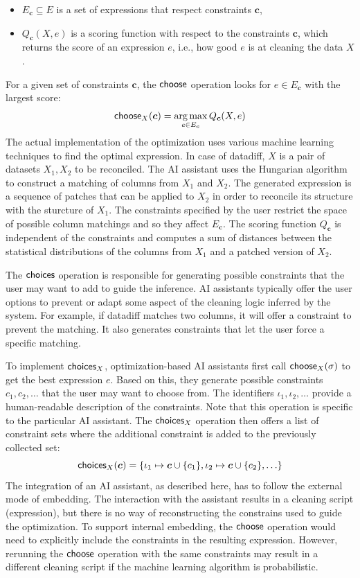 \documentclass[a4paper,UKenglish,cleveref, autoref, thm-restate]{lipics-v2021}
\newcommand{\ident}[1]{\textsf{#1}}
\newcommand{\select}{\textnormal{\ident{choose}}}
\newcommand{\choices}{\textnormal{\ident{choices}}}
\DeclareMathOperator{\argmax}{arg\,max}
\begin{document}
\begin{itemize}
\item $E_{\boldsymbol{c}}\subseteq E$ is a set of expressions that respect constraints $\boldsymbol{c}$,
\item $Q_{\boldsymbol{c}}(X, e)$ is a scoring function with respect to the constraints $\boldsymbol{c}$,
  which returns the score of an expression $e$, i.e., how good $e$ is at cleaning the data $X$.
\end{itemize}

\noindent
For a given set of constraints $\boldsymbol{c}$, the $\select$ operation looks
for $e\in E_{\boldsymbol{c}}$ with the largest score:
\[
\select_X(\boldsymbol{c}) = \argmax_{e \in E_{\boldsymbol{c}}} Q_{\boldsymbol{c}}(X, e)
\]
The actual implementation of the optimization uses various machine learning techniques to
find the optimal expression. In case of datadiff, $X$ is a pair of datasets $X_1, X_2$ to be
reconciled. The AI assistant uses the Hungarian algorithm \cite{sutton-2018-datadiff} to construct
a matching of columns from $X_1$ and $X_2$. The generated expression is a sequence of patches
that can be applied to $X_2$ in order to reconcile its structure with the sturcture of $X_1$.
The constraints specified by the user restrict the space of possible column matchings and so they
affect $E_\boldsymbol{c}$. The scoring function $Q_\boldsymbol{c}$ is independent of
the constraints and computes a sum of distances between the statistical distributions of the
columns from $X_1$ and a patched version of $X_2$.

The $\choices$ operation is responsible for generating possible constraints that the user may
want to add to guide the inference. AI assistants typically offer the user options to prevent
or adapt some aspect of the cleaning logic inferred by the system. For example, if datadiff
matches two columns, it will offer a constraint to prevent the matching. It also generates
constraints that let the user force a specific matching.

To implement $\choices_X$, optimization-based AI assistants first call $\select_X(\sigma)$ to
get the best expression $e$. Based on this, they generate possible constraints $c_1, c_2, \ldots$
that the user may want to choose from. The identifiers $\iota_1,\iota_2, \ldots$ provide a
human-readable description of the constraints. Note that this operation is specific to the particular
AI assistant. The $\choices_X$ operation then offers a list of constraint sets where the additional
constraint is added to the previously collected set:
\[
\choices_X(\boldsymbol{c}) = \{\iota_1 \mapsto \boldsymbol{c}\cup\{ c_1 \}, \iota_2\mapsto\boldsymbol{c}\cup\{ c_2 \}, \ldots\}
\]
The integration of an AI assistant, as described here, has to follow the external mode of embedding.
The interaction with the assistant results in a cleaning script (expression), but there is no way
of reconstructing the constrains used to guide the optimization. To support internal embedding, the
$\select$ operation would need to explicitly include the constraints in the resulting expression.
However, rerunning the $\select$ operation with the same constraints may result in a different
cleaning script if the machine learning algorithm is probabilistic.
\end{document}
